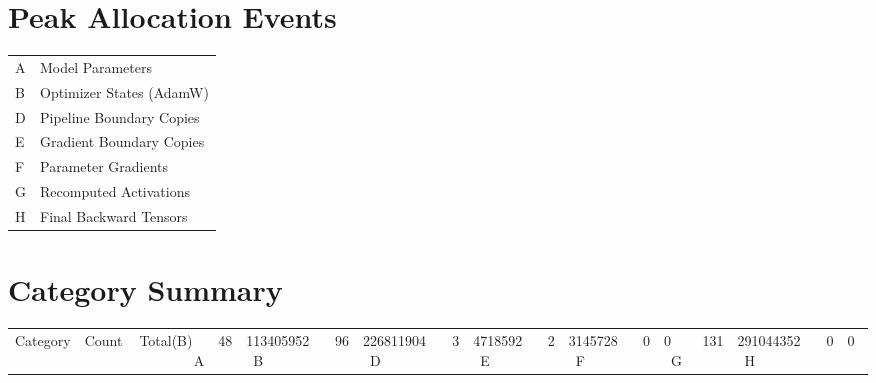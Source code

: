 \documentclass{article}
\begin{document}
\section*{Peak Allocation Events}
\small
\begin{tabular}{ll}
A & Model Parameters \\
B & Optimizer States (AdamW) \\
D & Pipeline Boundary Copies \\
E & Gradient Boundary Copies \\
F & Parameter Gradients \\
G & Recomputed Activations \\
H & Final Backward Tensors \\
\end{tabular}
\vspace{0.5em}
\section*{Category Summary}
\begin{tabular}{l r r}
Category & Count & Total(B) \
\hline
A & 48 & 113405952 \
B & 96 & 226811904 \
D & 3 & 4718592 \
E & 2 & 3145728 \
F & 0 & 0 \
G & 131 & 291044352 \
H & 0 & 0 \
\end{tabular}
\vspace{0.5em}
\end{document}
